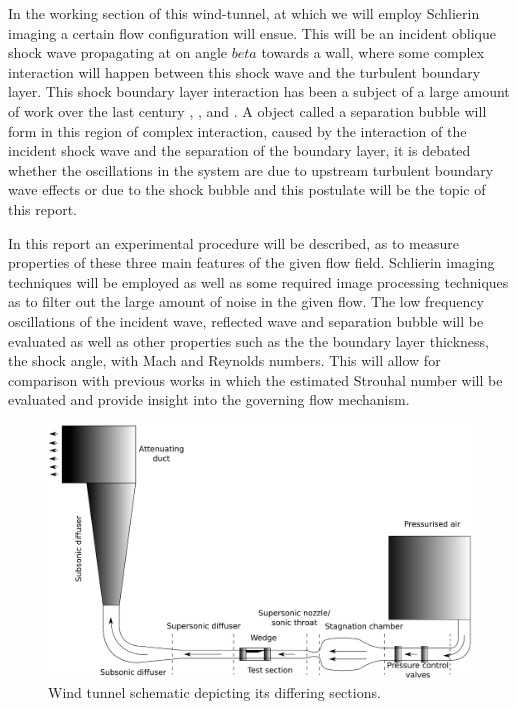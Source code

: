 \documentclass[a4paper,10pt,twoside]{article}
\begin{document}
\begin{multicols}{2}
In the working section of this wind-tunnel, at which we will employ Schlierin imaging a certain flow configuration will ensue. This will be an incident oblique shock wave propagating at on angle $beta$ towards a wall, where some complex interaction will happen between this shock wave and the turbulent boundary layer. This shock boundary layer interaction has been a subject of a large amount of work over the last century \cite{3}, \cite{5}, \cite{6} and \cite{7}. A object called a separation bubble will form in this region of complex interaction, caused by the interaction of the incident shock wave and the separation of the boundary layer, it is debated whether the oscillations in the system are due to upstream turbulent boundary wave effects or due to the shock bubble and this postulate will be the topic of this report. \par



In this report an experimental procedure will be described, as to measure properties of these three main features of the given flow field. Schlierin imaging techniques will be employed as well as some required image processing techniques as to filter out the large amount of noise in the given flow. The low frequency oscillations of the incident wave, reflected wave and separation bubble will be evaluated as well as other properties such as the the boundary layer thickness, the shock angle, with Mach and Reynolds numbers. This will allow for comparison with previous works in which the estimated Strouhal number will be evaluated and provide insight into the governing flow mechanism.










\end{multicols}



\begin{figure}[H]
    \centering
    \includegraphics[width=\linewidth]{Windtunnel_scematic.eps}
    \caption{Wind tunnel schematic depicting its differing sections.}
    \label{fig:my_label}
\end{figure}
\end{document}
